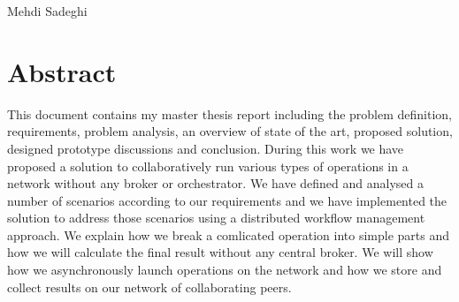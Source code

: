 \documentclass[12pt, a4paper, oneside]{report}
\newcounter{chapter_count}
\begin{document}
Mehdi Sadeghi

\chapter*{Abstract}
This document contains my master thesis report including the problem definition, requirements, problem analysis,
an overview of state of the art, proposed solution, designed prototype discussions and conclusion.
During this work we have proposed a solution to collaboratively run various types of operations in a network without any broker or orchestrator. 
We have defined and analysed a number of scenarios according to our requirements 
and we have implemented the solution to address those scenarios using a distributed workflow management approach. We explain how
we break a comlicated operation into simple parts and how we will calculate the final result without any central broker. We will show how
we asynchronously launch operations on the network and how we store and collect results on our network of collaborating peers.


\tableofcontents
\newpage




\printbibliography[heading=bibintoc, title={References}]
\end{document}
